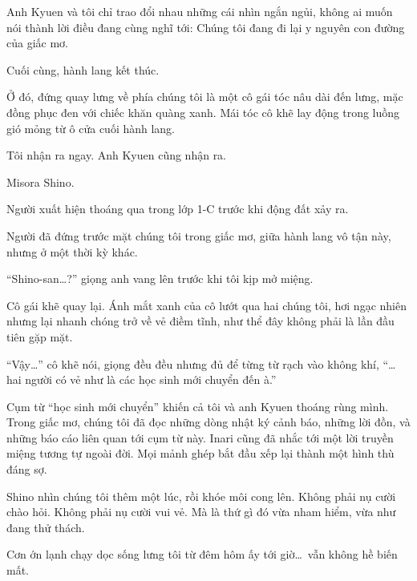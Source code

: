 \documentclass[../main.tex]{subfiles}
\begin{document}
Anh Kyuen và tôi chỉ trao đổi nhau những cái nhìn ngắn ngủi, không ai muốn nói thành lời điều đang cùng nghĩ tới: Chúng tôi đang đi lại y nguyên con đường của giấc mơ.

Cuối cùng, hành lang kết thúc.

Ở đó, đứng quay lưng về phía chúng tôi là một cô gái tóc nâu dài đến lưng, mặc đồng phục đen với chiếc khăn quàng xanh. Mái tóc cô khẽ lay động trong luồng gió mỏng từ ô cửa cuối hành lang.

Tôi nhận ra ngay. Anh Kyuen cũng nhận ra.

Misora Shino.

Người xuất hiện thoáng qua trong lớp 1-C trước khi động đất xảy ra.

Người đã đứng trước mặt chúng tôi trong giấc mơ, giữa hành lang vô tận này, nhưng ở một thời kỳ khác.

``Shino-san\dots?'' giọng anh vang lên trước khi tôi kịp mở miệng.

Cô gái khẽ quay lại. Ánh mắt xanh của cô lướt qua hai chúng tôi, hơi ngạc nhiên nhưng lại nhanh chóng trở về vẻ điềm tĩnh, như thể đây không phải là lần đầu tiên gặp mặt.


``Vậy\dots'' cô khẽ nói, giọng đều đều nhưng đủ để từng từ rạch vào không khí, ``\dots hai người có vẻ như là các học sinh mới chuyển đến à.''

Cụm từ ``học sinh mới chuyển'' khiến cả tôi và anh Kyuen thoáng rùng mình. Trong giấc mơ, chúng tôi đã đọc những dòng nhật ký cảnh báo, những lời đồn, và những báo cáo liên quan tới cụm từ này. Inari cũng đã nhắc tới một lời truyền miệng tương tự ngoài đời. Mọi mảnh ghép bắt đầu xếp lại thành một hình thù đáng sợ.

Shino nhìn chúng tôi thêm một lúc, rồi khóe môi cong lên. Không phải nụ cười chào hỏi. Không phải nụ cười vui vẻ. Mà là thứ gì đó vừa nham hiểm, vừa như đang thử thách.

Cơn ớn lạnh chạy dọc sống lưng tôi từ đêm hôm ấy tới giờ\dots\ vẫn không hề biến mất.
\end{document}
